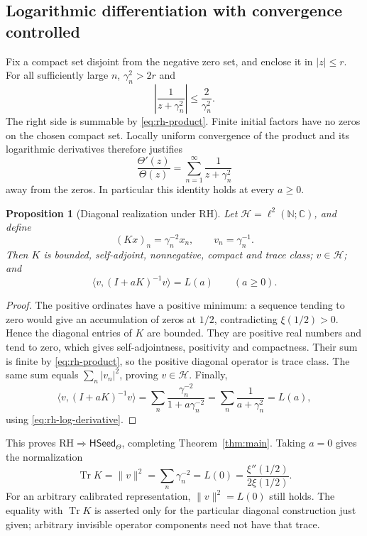 \documentclass[11pt,a4paper]{article}
\numberwithin{equation}{section}
\newtheorem{proposition}[theorem]{Proposition}
\theoremstyle{definition}
\theoremstyle{remark}
\newcommand{\C}{\mathbb C}
\newcommand{\N}{\mathbb N}
\newcommand{\HH}{\mathcal H}
\newcommand{\ip}[2]{\langle #1,#2\rangle}
\newcommand{\norm}[1]{\lVert #1\rVert}
\newcommand{\RH}{\mathrm{RH}}
\newcommand{\HSeed}{\mathsf{HSeed}_{\Theta}}
\DeclareMathOperator{\Tr}{Tr}
\begin{document}
\subsection{Logarithmic differentiation with convergence controlled}

Fix a compact set disjoint from the negative zero set, and enclose it
in $|z|\leq r$. For all sufficiently large $n$,
$\gamma_n^2>2r$ and
\[
\left|\frac1{z+\gamma_n^2}\right|\leq\frac2{\gamma_n^2}.
\]
The right side is summable by \eqref{eq:rh-product}. Finite initial
factors have no zeros on the chosen compact set. Locally uniform
convergence of the product and its logarithmic derivatives therefore
justifies
\begin{equation}\label{eq:rh-log-derivative}
\frac{\Theta'(z)}{\Theta(z)}
=\sum_{n=1}^{\infty}\frac1{z+\gamma_n^2}
\end{equation}
away from the zeros. In particular this identity holds at every
$a\geq0$.

\begin{proposition}[Diagonal realization under RH]\label{prop:diagonal}
Let $\HH=\ell^2(\N;\C)$, and define
\begin{equation}\label{eq:diagonal-data}
(Kx)_n=\gamma_n^{-2}x_n,\qquad v_n=\gamma_n^{-1}.
\end{equation}
Then $K$ is bounded, self-adjoint, nonnegative, compact and trace
class; $v\in\HH$; and
\begin{equation}\label{eq:diagonal-calibration}
\ip v{(I+aK)^{-1}v}=L(a)\qquad(a\geq0).
\end{equation}
\end{proposition}
\begin{proof}
The positive ordinates have a positive minimum: a sequence tending to
zero would give an accumulation of zeros at $1/2$, contradicting
$\xi(1/2)>0$. Hence the diagonal entries of $K$ are bounded.
They are positive real numbers and tend to zero, which gives
self-adjointness, positivity and compactness. Their sum is finite
by \eqref{eq:rh-product}, so the positive diagonal operator is trace
class. The same sum equals $\sum_n|v_n|^2$, proving $v\in\HH$.
Finally,
\[
\ip v{(I+aK)^{-1}v}
=\sum_n\frac{\gamma_n^{-2}}{1+a\gamma_n^{-2}}
=\sum_n\frac1{a+\gamma_n^2}=L(a),
\]
using \eqref{eq:rh-log-derivative}.
\end{proof}

This proves $\RH\Rightarrow\HSeed$, completing
Theorem~\ref{thm:main}. Taking $a=0$ gives the normalization
\begin{equation}\label{eq:trace-norm}
\Tr K=\norm v^2=\sum_n\gamma_n^{-2}
=L(0)=\frac{\xi''(1/2)}{2\xi(1/2)}.
\end{equation}
For an arbitrary calibrated representation, $\norm v^2=L(0)$ still
holds. The equality with $\Tr K$ is asserted only for the particular
diagonal construction just given; arbitrary invisible operator components
need not have that trace.
\end{document}
